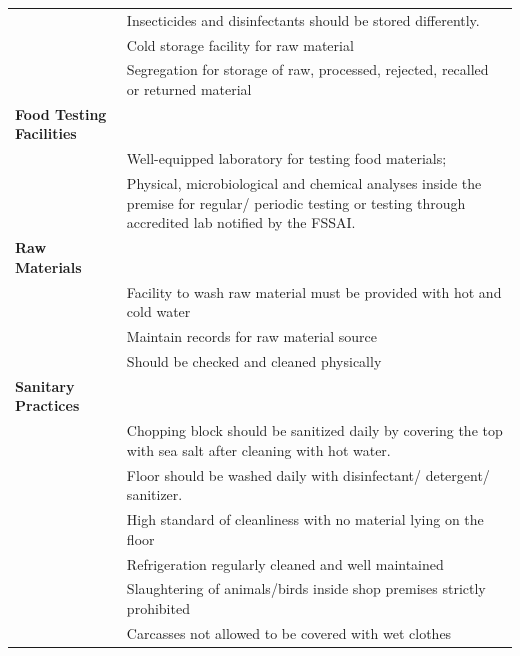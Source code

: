 \documentclass[a4paper, 12pt, twoside]{article}
\newcommand\tabitem{\makebox[1em][r]{\textbullet~}}
\begin{document}
\begin{longtable}[l]{>{\raggedright}p{6.5cm}>{\raggedright\arraybackslash}p{8.5cm}}
	&	\newline{}\tabitem Insecticides and disinfectants should be stored differently.\\
	&	\newline{}\tabitem Cold storage facility for raw material\\
	&	\newline{}\tabitem Segregation for storage of raw, processed, rejected, recalled or returned material \\
    \midrule
 \textbf{Food Testing Facilities}	&	 \\
    \midrule
          & \tabitem Well-equipped laboratory for testing food materials;\\
	&  \newline{} \tabitem Physical, microbiological and chemical analyses inside the premise for regular/ periodic testing or testing through accredited lab notified by the FSSAI. \\
	    \midrule
    \textbf{Raw Materials}	&	 \\
    \midrule
          &	\tabitem Facility to wash raw material must be provided with hot and cold water\\
	&	\newline{} \tabitem Maintain records for raw material source\\
	&	\newline{}\tabitem Should be checked and cleaned physically \\
\midrule
\textbf{Sanitary Practices}	&	 \\
    \midrule
          &	\tabitem Chopping block should be sanitized daily by covering the top with sea salt after cleaning with hot water.\\
	&	\newline{}\tabitem Floor should be washed daily with disinfectant/ detergent/ sanitizer.\\
	&	\newline{}\tabitem High standard of cleanliness with no material lying on the floor\\
	&	\newline{}\tabitem Refrigeration regularly cleaned \newline{}and well maintained\\
	&	\newline{}\tabitem Slaughtering of animals/birds inside shop premises strictly prohibited\\
	&	\newline{}\tabitem Carcasses not allowed to be covered with wet clothes\\

\end{longtable}
\end{document}
